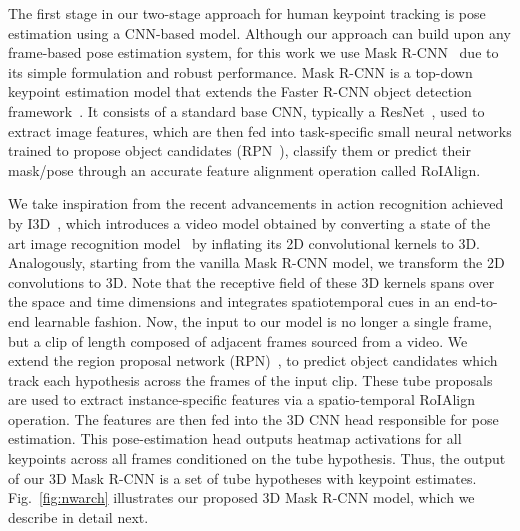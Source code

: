 \documentclass[10pt,twocolumn,letterpaper]{article}
\newcommand{\MODEL}[0]{3D Mask R-CNN}
\begin{document}
The first stage in our two-stage approach for human keypoint tracking is pose estimation using a CNN-based model. 
Although our approach can build upon any frame-based pose estimation system, for this work we use Mask R-CNN~\cite{he2017mask} due to its simple formulation and robust performance. Mask R-CNN is a top-down keypoint estimation model that extends the Faster R-CNN object detection framework~\cite{ren2015faster}. It consists of a standard base CNN, typically a ResNet~\cite{He15resnet}, used to extract image features, which are then fed into task-specific small neural networks trained to propose object candidates (RPN~\cite{ren2015faster}), classify them or predict their mask/pose through an accurate feature alignment operation called RoIAlign.

We take inspiration from the recent advancements in action recognition achieved by I3D~\cite{carreira2017quo}, which introduces a video model obtained by converting a state of the art image recognition model~\cite{ioffe2015batch} by inflating its 2D convolutional kernels to 3D.
Analogously, starting from the vanilla Mask R-CNN model, we transform the 2D convolutions to 3D.
Note that the receptive field of these 3D kernels spans over the space and time dimensions and integrates spatiotemporal cues in an end-to-end learnable fashion. Now, the input to our model is no longer a single frame, but a clip of length  composed of adjacent frames sourced from a video. We extend the region proposal network (RPN)~\cite{ren2015faster}, to predict object candidates which track each hypothesis across the frames of the input clip. These tube proposals are used to extract instance-specific features via a spatio-temporal RoIAlign operation. The features are then fed into the 3D CNN head responsible for pose estimation. This pose-estimation head outputs heatmap activations for all keypoints across all frames conditioned on the tube hypothesis. Thus, the output of our \MODEL{} is a set of tube hypotheses with 
keypoint estimates.
Fig.~\ref{fig:nwarch} illustrates our proposed \MODEL{} model, which we describe in detail next.
\end{document}
